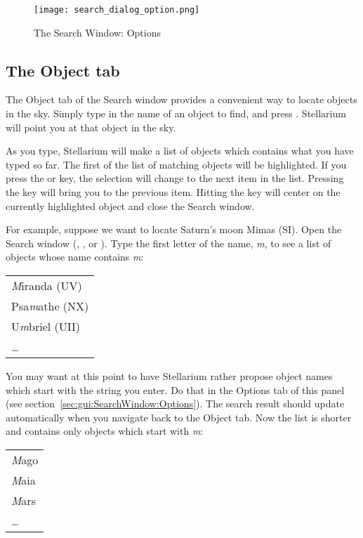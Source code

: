 \begin{figure}[tbp]
\centering\texttt{[image: search\_dialog\_option.png]}
\caption{The Search Window: Options}
\label{fig:gui:search:options}
\end{figure}

\subsection{The Object tab}
\label{sec:gui:SearchWindow:Object}
The Object tab of the Search window provides a convenient way to locate objects
in the sky. Simply type in the name of an object to find, and press
\key{\return}. Stellarium will point you at that object in the sky.

As you type, Stellarium will make a list of objects which contains 
what you have typed so far. The first of the list of matching objects
will be highlighted. If you press the \key{\tab} or \key{\arrowkeydown} key,
the selection will change to the next item in the list.
Pressing the \key{\arrowkeyup} key will bring you to the previous item.
Hitting the \key{\return} key will center on the
currently highlighted object and close the Search window.

For example, suppose we want to locate Saturn's moon Mimas (SI).
Open the Search window (, , or ).
Type the first letter of the name, \emph{m}, to see a list
of objects whose name contains \emph{m}:
\begin{center}
\begin{tabular}{l}
        \emph{M}iranda (UV)\\
        Psa\emph{m}athe (NX)\\
        U\emph{m}briel (UII)\\
        \ldots\\
\end{tabular}
\end{center}

\noindent You may want at this point to have Stellarium rather propose object
names which start with the string you enter. Do that in the Options tab
of this panel (see section~\ref{sec:gui:SearchWindow:Options}).
The search result should update automatically
when you navigate back to the Object tab.
Now the list is shorter and contains only objects which start
with \emph{m}:
\begin{center}
\begin{tabular}{l}
        \emph{M}ago\\
        \emph{M}aia\\
        \emph{M}ars\\
        \ldots\\
\end{tabular}
\end{center}

